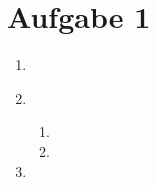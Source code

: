 \documentclass[11pt]{article}
\begin{document}
	\section*{Aufgabe 1}
	
	\begin{enumerate}[label=(\alph*)]
	
		\item 
		
		\item
		
		\ \begin{enumerate}[label=(\roman*)]
	
			\item
		
			\item
		
		\end{enumerate}
		
		\item
		
	\end{enumerate}
	
\end{document}
